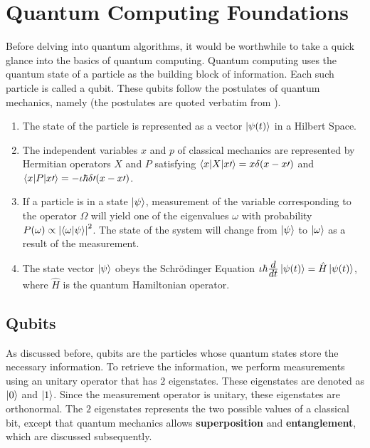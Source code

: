 \section{Quantum Computing Foundations}
\noindent Before delving into quantum algorithms, it would be worthwhile to take a quick glance into the basics of quantum computing. Quantum computing uses the quantum state of a particle as the building block of information. Each such particle is called a qubit. These qubits follow the postulates of quantum mechanics\cite{shankar}, namely (the postulates are quoted verbatim from \cite{shankar}).
\begin{enumerate}
\item The state of the particle is represented as a vector $\left\vert \psi(t)\right\rangle$ in a Hilbert Space.
\item The independent variables $x$ and $p$ of classical mechanics are represented by Hermitian operators $X$ and $P$ satisfying $\left\langle x\vert X\vert x\prime\right\rangle=x\delta(x-x\prime)$ and $\left\langle x\vert P\vert x\prime\right\rangle=-\iota\hbar\delta\prime(x-x\prime)$.
\item If a particle is in a state $\left\vert \psi\right\rangle$, measurement of the variable corresponding to the operator $\Omega$ will yield one of the eigenvalues $\omega$ with probability $P(\omega)\propto\left\lvert\left\langle \omega\vert \psi\right\rangle\right\rvert ^2$. The state of the system will change from $\left\vert \psi\right\rangle$ to $\left\vert \omega\right\rangle$ as a result of the measurement.
\item The state vector $\left\vert \psi\right\rangle$ obeys the Schrödinger Equation $\iota\hbar\frac{\displaystyle d}{\displaystyle dt}\left\vert \psi(t)\right\rangle=\hat{H}\left\vert \psi(t)\right\rangle$, where $\hat{H}$ is the quantum Hamiltonian operator.
\end{enumerate}
\subsection{Qubits}
As discussed before, qubits are the particles whose quantum states store the necessary information. To retrieve the information, we perform measurements using an unitary operator that has $2$ eigenstates. These eigenstates are denoted as $\left\vert 0\right\rangle$ and $\left\vert 1\right\rangle$. Since the measurement operator is unitary, these eigenstates are orthonormal. The $2$ eigenstates represents the two possible values of a classical bit, except that quantum mechanics allows \textbf{superposition} and \textbf{entanglement}, which are discussed subsequently.
